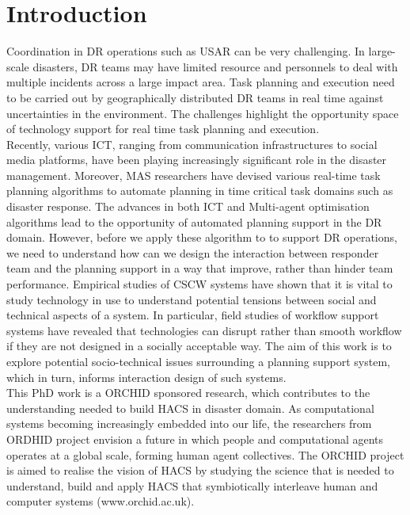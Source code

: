 \chapter{Introduction}\label{ch:introduction}
Coordination in \acf{DR} operations such as \acf{USAR} can be very challenging. In large-scale disasters, DR teams may have limited resource and personnels to deal with multiple incidents across a large impact area. Task planning and execution need to be carried out by geographically distributed DR teams in real time against uncertainties in the environment. The challenges highlight the opportunity space of technology support for real time task planning and execution.  \\ 

Recently, various \acf{ICT}, ranging from communication infrastructures to social media platforms, have been playing increasingly significant role in the disaster management.  Moreover, \acf{MAS} researchers have devised various real-time task planning algorithms to automate planning in time critical task domains such as disaster response. The advances in both \ac{ICT} and Multi-agent optimisation algorithms lead to the opportunity of automated planning support in the \ac{DR} domain. However, before we apply these algorithm to to support \ac{DR} operations, we need to understand how can we design the interaction between responder team and the planning support in a way that improve, rather than hinder team performance. Empirical studies of \acf{CSCW} systems have shown that it is vital to study technology in use to understand potential tensions between social and technical aspects of a system. In particular, field studies of workflow support systems have revealed that technologies can disrupt rather than smooth workflow if they are not designed in a socially acceptable way. The aim of this work is to explore potential socio-technical issues surrounding a planning support system, which in turn, informs interaction design of such systems. \\

This PhD work is a ORCHID sponsored research, which contributes to the understanding needed to build \acf{HACS} in disaster domain. As computational systems  becoming increasingly embedded into our life, the researchers from ORDHID project envision a future in which people and computational agents operates at a global scale, forming human agent collectives. The ORCHID project is aimed to realise the vision of \ac{HACS} by studying the science that is needed to understand, build and apply \ac{HACS} that symbiotically interleave human and computer systems (www.orchid.ac.uk).\\

